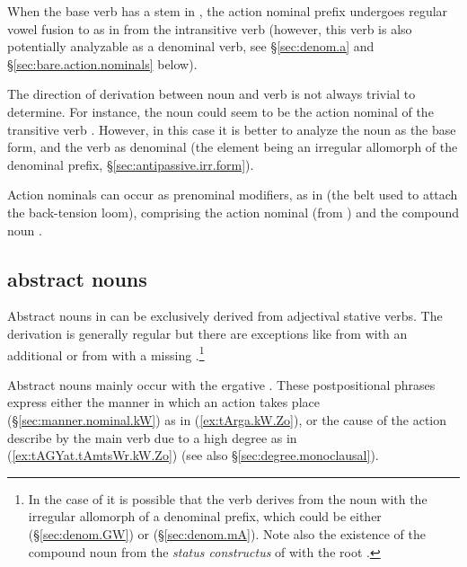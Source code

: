When the base verb has a stem in , the action nominal prefix  undergoes regular vowel fusion  to  as in  from the intransitive verb  (however, this verb is also potentially analyzable as a  denominal verb, see §\ref{sec:denom.a} and §\ref{sec:bare.action.nominals} below).

The direction of derivation between noun and verb is not always trivial to determine. For instance, the noun  could seem to be the action nominal of the transitive verb . However, in this case it is better to analyze the noun as the base form, and the verb as denominal (the  element being an irregular allomorph of the  denominal prefix, §\ref{sec:antipassive.irr.form}).

Action nominals can occur as prenominal modifiers, as in  (the belt used to attach  the back-tension loom), comprising the action nominal  (from ) and the compound noun .

\subsection{ abstract nouns} \label{sec:tA.abstract.nouns}
Abstract nouns in  can be exclusively derived from adjectival stative verbs. The derivation is generally regular but there are exceptions like  from  with an additional  or   from  with a missing .\footnote{In the case of  it is possible that the verb  derives from the noun with the irregular allomorph of a denominal prefix, which could be either  (§\ref{sec:denom.GW}) or  (§\ref{sec:denom.mA}). Note also the existence of the compound noun  from the \textit{status constructus} of  with the root . }

Abstract nouns mainly occur with the ergative . These postpositional phrases express either the manner in which an action takes place (§\ref{sec:manner.nominal.kW}) as in (\ref{ex:tArga.kW.Zo}), or the cause of the action describe by the main verb due to a high degree as in (\ref{ex:tAGYat.tAmtsWr.kW.Zo}) (see also §\ref{sec:degree.monoclausal}). 

